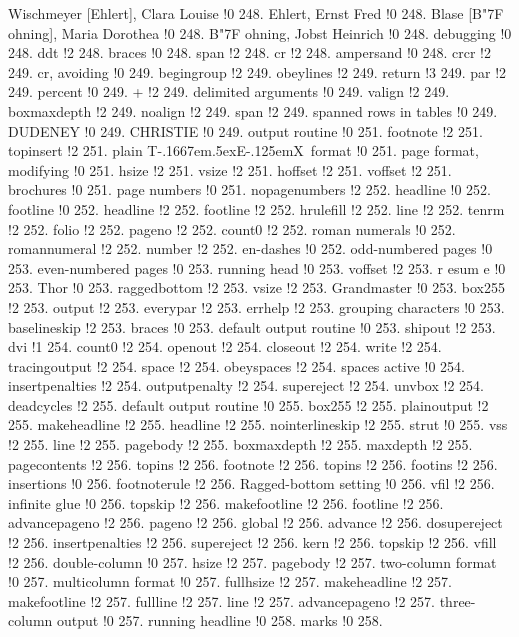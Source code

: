 Wischmeyer [Ehlert], Clara Louise !0 248.
Ehlert, Ernst Fred !0 248.
Blase [B{\accent "7F o}hning], Maria Dorothea !0 248.
B{\accent "7F o}hning, Jobst Heinrich !0 248.
debugging !0 248.
ddt !2 248.
braces !0 248.
span !2 248.
cr !2 248.
ampersand !0 248.
crcr !2 249.
cr, avoiding !0 249.
begingroup !2 249.
obeylines !2 249.
return !3 249.
par !2 249.
percent !0 249.
+ !2 249.
delimited arguments !0 249.
valign !2 249.
boxmaxdepth !2 249.
noalign !2 249.
span !2 249.
spanned rows in tables !0 249.
DUDENEY !0 249.
CHRISTIE !0 249.
output routine !0 251.
footnote !2 251.
topinsert !2 251.
plain T\kern -.1667em\lower .5ex\hbox {E}\kern -.125emX\ format !0 251.
page format, modifying !0 251.
hsize !2 251.
vsize !2 251.
hoffset !2 251.
voffset !2 251.
brochures !0 251.
page numbers !0 251.
nopagenumbers !2 252.
headline !0 252.
footline !0 252.
headline !2 252.
footline !2 252.
hrulefill !2 252.
line !2 252.
tenrm !2 252.
folio !2 252.
pageno !2 252.
count0 !2 252.
roman numerals !0 252.
romannumeral !2 252.
number !2 252.
en-dashes !0 252.
odd-numbered pages !0 253.
even-numbered pages !0 253.
running head !0 253.
voffset !2 253.
r{ e}sum{ e} !0 253.
Thor !0 253.
raggedbottom !2 253.
vsize !2 253.
Grandmaster !0 253.
box255 !2 253.
output !2 253.
everypar !2 253.
errhelp !2 253.
grouping characters !0 253.
baselineskip !2 253.
braces !0 253.
default output routine !0 253.
shipout !2 253.
dvi !1 254.
count0 !2 254.
openout !2 254.
closeout !2 254.
write !2 254.
tracingoutput !2 254.
space !2 254.
obeyspaces !2 254.
spaces active !0 254.
insertpenalties !2 254.
outputpenalty !2 254.
supereject !2 254.
unvbox !2 254.
deadcycles !2 255.
default output routine !0 255.
box255 !2 255.
plainoutput !2 255.
makeheadline !2 255.
headline !2 255.
nointerlineskip !2 255.
strut !0 255.
vss !2 255.
line !2 255.
pagebody !2 255.
boxmaxdepth !2 255.
maxdepth !2 255.
pagecontents !2 256.
topins !2 256.
footnote !2 256.
topins !2 256.
footins !2 256.
insertions !0 256.
footnoterule !2 256.
Ragged-bottom setting !0 256.
vfil !2 256.
infinite glue !0 256.
topskip !2 256.
makefootline !2 256.
footline !2 256.
advancepageno !2 256.
pageno !2 256.
global !2 256.
advance !2 256.
dosupereject !2 256.
insertpenalties !2 256.
supereject !2 256.
kern !2 256.
topskip !2 256.
vfill !2 256.
double-column !0 257.
hsize !2 257.
pagebody !2 257.
two-column format !0 257.
multicolumn format !0 257.
fullhsize !2 257.
makeheadline !2 257.
makefootline !2 257.
fullline !2 257.
line !2 257.
advancepageno !2 257.
three-column output !0 257.
running headline !0 258.
marks !0 258.
